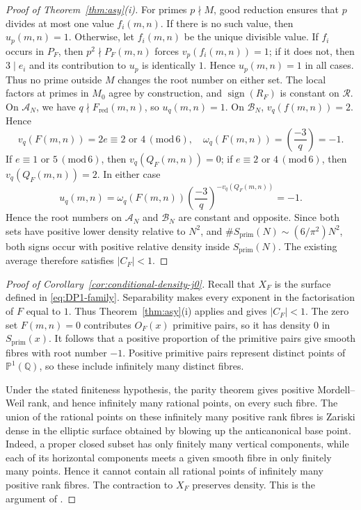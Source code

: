 \documentclass[12pt,reqno]{amsart}
\numberwithin{equation}{section}
\theoremstyle{definition}
\newcommand{\PP}{\mathbb{P}}
\newcommand{\QQ}{\mathbb{Q}}
\DeclareMathOperator{\sign}{sign}
\renewcommand{\pmod}[1]{\,(\mathrm{mod}\,#1)}
\begin{document}
\begin{proof}[Proof of Theorem~\ref{thm:asy}(i)]
For primes $p\nmid M$, good reduction ensures that $p$ divides at most one value $f_i(m,n)$.
If there is no such value, then $u_p(m,n)=1$.
Otherwise, let $f_i(m,n)$ be the unique divisible value.
If $f_i$ occurs in $P_F$, then $p^2\nmid P_F(m,n)$ forces $v_p(f_i(m,n))=1$; if it does not, then $3\mid e_i$ and its contribution to $u_p$ is identically $1$.
Hence $u_p(m,n)=1$ in all cases.
Thus no prime outside $M$ changes the root number on either set.
The local factors at primes in $M_0$ agree by construction, and $\sign(R_F)$ is constant on $\mathcal R$.
On $\mathcal A_N$, we have $q\nmid F_{\mathrm{red}}(m,n)$, so $u_q(m,n)=1$.
On $\mathcal B_N$, $v_q(f(m,n))=2$.
Hence
\[
v_q(F(m,n))=2e\equiv 2\text{ or }4\pmod 6,
\quad
\omega_q(F(m,n))=\left(\frac{-3}{q}\right)=-1.
\]
If $e\equiv1$ or $5\pmod6$, then $v_q(Q_F(m,n))=0$; if $e\equiv2$ or $4\pmod6$, then $v_q(Q_F(m,n))=2$.
In either case
\[
u_q(m,n)=\omega_q(F(m,n))
\left(\frac{-3}{q}\right)^{-v_q(Q_F(m,n))}=-1.
\]
Hence the root numbers on $\mathcal A_N$ and $\mathcal B_N$ are constant and opposite.
Since both sets have positive lower density relative to $N^2$, and $\#S_{\mathrm{prim}}(N)\sim(6/\pi^2)N^2$, both signs occur with positive relative density inside $S_{\mathrm{prim}}(N)$.
The existing average therefore satisfies $|C_F|<1$.
\end{proof}

\begin{proof}[Proof of Corollary~\ref{cor:conditional-density-j0}]
Recall that $X_F$ is the surface defined in \eqref{eq:DP1-family}.
Separability makes every exponent in the factorisation of $F$ equal to $1$.
Thus Theorem~\ref{thm:asy}(i) applies and gives $|C_F|<1$.
The zero set $F(m,n)=0$ contributes $O_F(x)$ primitive pairs, so it has density $0$ in $S_{\mathrm{prim}}(x)$.
It follows that a positive proportion of the primitive pairs give smooth fibres with root number $-1$.
Positive primitive pairs represent distinct points of $\PP^1(\QQ)$, so these include infinitely many distinct fibres.

Under the stated finiteness hypothesis, the parity theorem gives positive Mordell--Weil rank, and hence infinitely many rational points, on every such fibre.
The union of the rational points on these infinitely many positive rank fibres is Zariski dense in the elliptic surface obtained by blowing up the anticanonical base point.
Indeed, a proper closed subset has only finitely many vertical components, while each of its horizontal components meets a given smooth fibre in only finitely many points.
Hence it cannot contain all rational points of infinitely many positive rank fibres.
The contraction to $X_F$ preserves density.
This is the argument of \cite[Remark~4.6]{VA}.
\end{proof}
\end{document}
